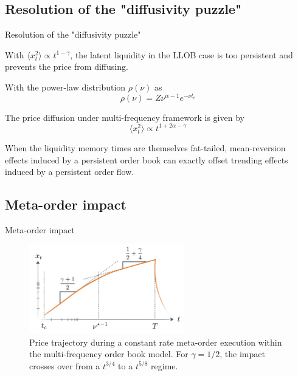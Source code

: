 \documentclass{beamer}
\begin{document}
\subsection{Resolution of the "diffusivity puzzle"}

\begin{frame}{Resolution of the "diffusivity puzzle"}

With $\langle x^2_t \rangle \propto t^{1-\gamma}$, the latent liquidity in the LLOB case is too persistent and prevents the price from diffusing. \newline

With the power-law distribution $\rho(\nu)$ as
\begin{equation}
\rho(\nu)=Z\nu^{\alpha-1}e^{-\nu t_c}
\end{equation}

The price diffusion under multi-frequency framework is given by
\begin{equation}
\langle x_t^2 \rangle \propto t^{1+2\alpha-\gamma}
\end{equation}

When the liquidity memory times are themselves fat-tailed, mean-reversion effects induced by a persistent order book can exactly offset trending effects induced by a persistent order flow.

\end{frame}

\subsection{Meta-order impact}

\begin{frame}{Meta-order impact}

\begin{figure}
\centering
\includegraphics[width=0.6\textwidth]{figure6.PNG}
\caption{\label{fig:f6}  Price trajectory during a constant rate meta-order execution within the multi-frequency order book model. For $\gamma = 1/2$, the impact crosses over from a $t^{3/4}$ to a $t^{5/8}$ regime.}
\end{figure}

\end{frame}
\end{document}

